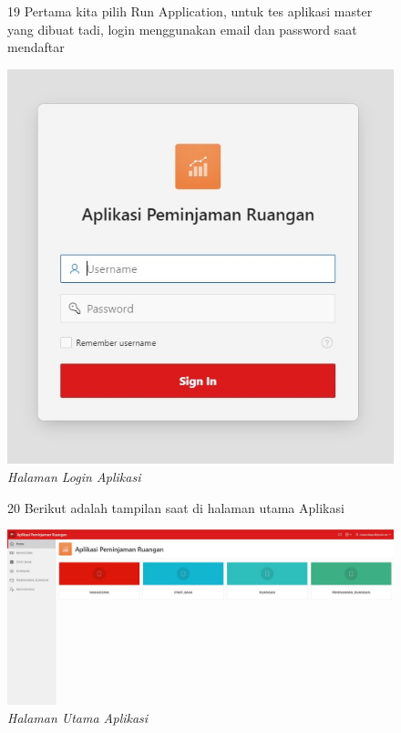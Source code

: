 \begin{itemize}
        \begin{figure}[!htbp]
        \item[19]Pertama kita pilih Run Application, untuk tes aplikasi master yang dibuat tadi, login menggunakan email dan password saat mendaftar
        \begin{center}
        \includegraphics[scale=0.6]{figures/halaman_login_aplikasi.jpg}
        \caption{\textit{Halaman Login Aplikasi}}
        \end{center}
        \end{figure}
        
        \begin{figure}[!htbp]
        \item[20]Berikut adalah tampilan saat di halaman utama Aplikasi
        \begin{center}
        \includegraphics[scale=0.19]{figures/halaman_utm_apps.jpg}
        \caption{\textit{Halaman Utama Aplikasi}}
        \end{center}
        \end{figure}
\end{itemize}
